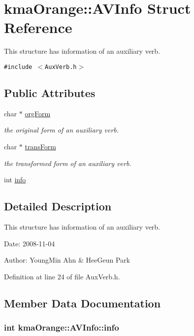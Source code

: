 \hypertarget{structkmaOrange_1_1AVInfo}{
\section{kmaOrange::AVInfo Struct Reference}
\label{structkmaOrange_1_1AVInfo}
}
This structure has information of an auxiliary verb.  


{\tt \#include $<$AuxVerb.h$>$}

\subsection*{Public Attributes}
\begin{CompactItemize}
\item 
char $\ast$ \hyperlink{structkmaOrange_1_1AVInfo_e27a83187cbb0e8cf03234f546e9ca56}{orgForm}
\begin{CompactList}\small\item\em the original form of an auxiliary verb. \item\end{CompactList}\item 
char $\ast$ \hyperlink{structkmaOrange_1_1AVInfo_cb2b9ac82f0aaa7319607f5577527d1c}{transForm}
\begin{CompactList}\small\item\em the transformed form of an auxiliary verb. \item\end{CompactList}\item 
int \hyperlink{structkmaOrange_1_1AVInfo_1936f9932c9dd9b71d114316107d867e}{info}
\end{CompactItemize}


\subsection{Detailed Description}
This structure has information of an auxiliary verb. 

\begin{Desc}
\item[Date:]2008-11-04 \end{Desc}
\begin{Desc}
\item[Author:]YoungMin Ahn \& HeeGeun Park \end{Desc}


Definition at line 24 of file AuxVerb.h.

\subsection{Member Data Documentation}
\hypertarget{structkmaOrange_1_1AVInfo_1936f9932c9dd9b71d114316107d867e}{
\subsubsection[{info}]{\setlength{\rightskip}{0pt plus 5cm}int {\bf kmaOrange::AVInfo::info}}}
\label{structkmaOrange_1_1AVInfo_1936f9932c9dd9b71d114316107d867e}





